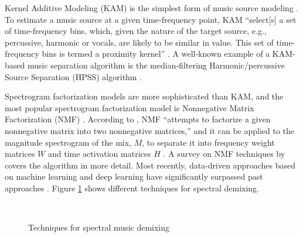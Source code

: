 \documentclass[report.tex]{subfiles}
\begin{document}
Kernel Additive Modeling (KAM) is the simplest form of music source modeling \parencite{musicsepgood}. To estimate a music source at a given time-frequency point, KAM ``select[s] a set of time-frequency bins, which, given the nature of the target source, e.g., percussive, harmonic or vocals, are likely to be similar in value. This set of time-frequency bins is termed a proximity kernel'' \parencite[36]{musicsepgood}. A well-known example of a KAM-based music separation algorithm is the median-filtering Harmonic/percussive Source Separation (HPSS) algorithm \parencite{fitzgerald1}.

Spectrogram factorization models are more sophisticated than KAM, and the most popular spectrogram factorization model is Nonnegative Matrix Factorization (NMF) \parencite{musicmask, musicsepgood}. According to \citeauthor{musicsepgood}, NMF ``attempts to factorize a given nonnegative matrix into two nonnegative matrices,'' and it can be applied to the magnitude spectrogram of the mix, $M$, to separate it into frequency weight matrices $W$ and time activation matrices $H$ \parencite[37]{musicsepgood}. A survey on NMF techniques by \textcite{nmfpaper} covers the algorithm in more detail. Most recently, data-driven approaches based on machine learning and deep learning have significantly surpassed past approaches \parencite{musicsepgood, sisec2018}. Figure \ref{fig:spectraldemix} shows different techniques for spectral demixing.

\begin{figure}[ht]
	\centering
	\\
	\caption{Techniques for spectral music demixing \parencite[36, 38]{musicsepgood}}
	\label{fig:spectraldemix}
\end{figure}
\end{document}
